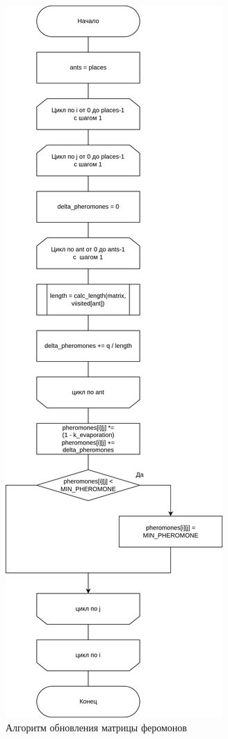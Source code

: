 \begin{figure}[h]
	\centering
	\includegraphics[height=0.9\textheight]{imgs/ant_phero.drawio}
	\caption{Алгоритм обновления матрицы феромонов}
	\label{fig:update}
\end{figure}


